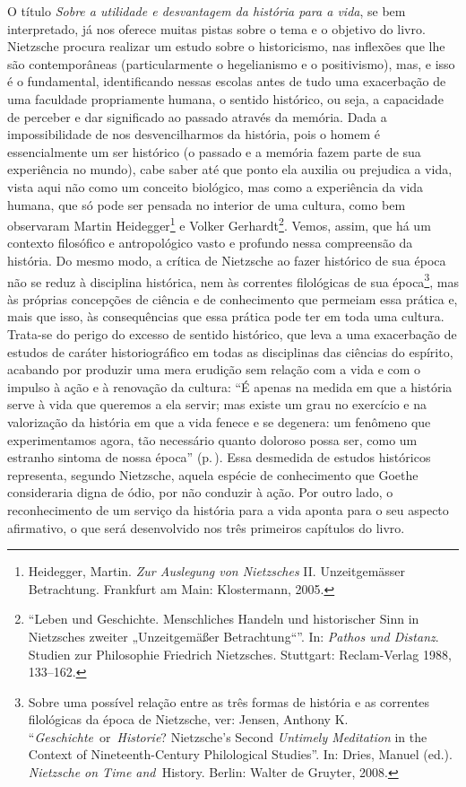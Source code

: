O título \emph{Sobre a utilidade e desvantagem da história para a vida},
se bem interpretado, já nos oferece muitas pistas sobre o tema e o
objetivo do livro. Nietz\-sche procura realizar um estudo sobre o
historicismo, nas inflexões que lhe são contemporâneas (particularmente
o hegelianismo e o positivismo), mas, e isso é o fundamental,
identificando nessas escolas antes de tudo uma exacerbação de uma
faculdade propriamente humana, o sentido histórico, ou seja, a
capacidade de perceber e dar significado ao passado através da memória.
Dada a impossibilidade de nos desvencilharmos da história, pois o homem
é essencialmente um ser histórico (o passado e a memória fazem parte de
sua experiência no mundo), cabe saber até que ponto ela auxilia ou
prejudica a vida, vista aqui não como um conceito biológico, mas como a
experiência da vida humana, que só pode ser pensada no interior de uma
cultura, como bem observaram Martin Heidegger\footnote{
  Heidegger, Martin. \emph{Zur Auslegung von Nietz\-sches} II.
  Unzeitgemässer Betrachtung. Frankfurt am Main: Klostermann,
  2005.}
e Volker Gerhardt\footnote{``Leben und Geschichte. Menschliches Handeln
  und historischer Sinn in Nietz\-sches zweiter „Unzeitgemäßer
  Betrachtung``''. In: \emph{Pathos und Distanz}. Studien zur
  Philosophie Friedrich Nietz\-sches. Stuttgart: Reclam-Verlag 1988,
  133--162.}. Vemos, assim, que há um contexto filosófico e
antropológico vasto e profundo nessa compreensão da história. Do mesmo
modo, a crítica de Nietz\-sche ao fazer histórico de sua época não se
reduz à disciplina histórica, nem às correntes filológicas de sua
época\footnote{Sobre uma possível relação entre as três formas de
  história e as correntes filológicas da época de Nietz\-sche, ver:
  Jensen, Anthony K. ``\emph{Geschichte}~or~\emph{Historie}? Nietz\-sche's
  Second \emph{Untimely Meditation} in the Context of Nineteenth-Century
  Philological Studies''. In: Dries, Manuel (ed.). \emph{Nietz\-sche on
  Time and~}History. Berlin: Walter de Gruyter, 2008.}, mas às próprias
concepções de ciência e de conhecimento que permeiam essa prática e,
mais que isso, às consequências que essa prática pode ter em toda uma
cultura. Trata-se do perigo do excesso de sentido histórico, que leva a
uma exacerbação de estudos de caráter historiográfico em todas as
disciplinas das ciências do espírito, acabando por produzir uma mera
erudição sem relação com a vida e com o impulso à ação e à renovação da
cultura: ``É apenas na medida em que a história serve à vida que
queremos a ela servir; mas existe um grau no exercício e na valorização
da história em que a vida fenece e se degenera: um fenômeno que
experimentamos agora, tão necessário quanto doloroso possa ser, como um
estranho sintoma de nossa época'' (p.\,\pageref{sintomadenossaepoca}). Essa desmedida de estudos
históricos representa, segundo Nietz\-sche, aquela espécie de conhecimento
que Goethe consideraria digna de ódio, por não conduzir à ação. Por
outro lado, o reconhecimento de um serviço da história para a vida
aponta para o seu aspecto afirmativo, o que será desenvolvido nos três
primeiros capítulos do livro.

